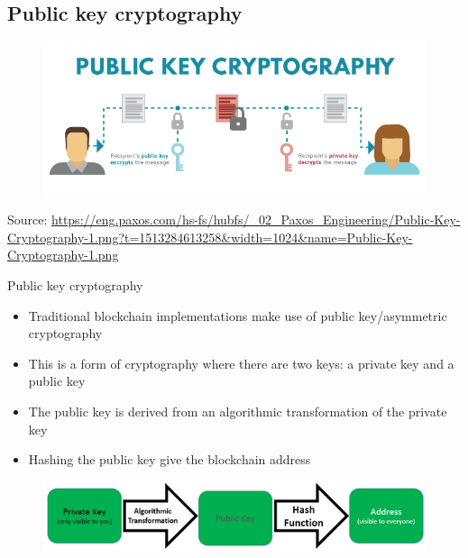 \documentclass[10pt]{beamer}
\begin{document}

\subsection{Public key cryptography}

\begin{frame}
	\begin{figure}[]
		\centering
		\includegraphics  [width=4.in]{Images/publickey1}
	\end{figure}
	\begin{tiny}
		Source: \href{https://eng.paxos.com/blockchain-separating-hype-from-substance-part-2}{https://eng.paxos.com/hs-fs/hubfs/\_02\_Paxos\_Engineering/Public-Key-Cryptography-1.png?t=1513284613258\&width=1024\&name=Public-Key-Cryptography-1.png}
	\end{tiny}
\end{frame}



\begin{frame}{Public key cryptography}
	\begin{itemize}
		\item Traditional blockchain implementations make use of public key/asymmetric cryptography
		\item This is a form of cryptography where there are two keys: a private key and a public key
		\item The public key is derived from an algorithmic transformation of the private key
		\item Hashing the public key give the blockchain address
	\end{itemize}
	\begin{figure}[]
		\centering
		\includegraphics  [scale=0.3]{Images/keys}
	\end{figure}
\end{frame}
\end{document}
